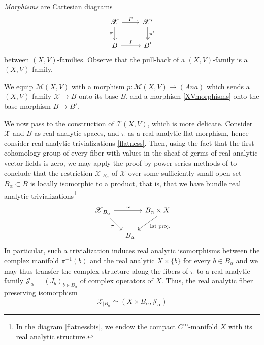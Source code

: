 \documentclass[10pt]{amsart}
\let\mathcal\mathscr
\newcommand{\Ana}{\mathit{Ana}}
\theoremstyle{plain}
\theoremstyle{definition}
\theoremstyle{remark}
\numberwithin{equation}{section}
\begin{document}
\emph{Morphisms} are Cartesian diagrams
\begin{equation}
\label{XVmorphisms}
\begin{tikzcd}
\mathcal X\arrow[r,"F"]\arrow[d,swap,"\pi"]&\mathcal X'\arrow[d,"\pi'"]\\
B\arrow[r,"f"]&B'
\end{tikzcd}
\end{equation}
between $(X,V)$-families. Observe that the pull-back of a $(X,V)$-family is a $(X,V)$-family.

We equip $\mathcal M(X,V)$ with a morphism $p:\mathcal M(X,V)\to (\Ana)$ which sends a $(X,V)$-family $\mathcal X\to B$ onto its base $B$, and a morphism \eqref{XVmorphisms} onto the base morphism $B\to B'$.

We now pass to the construction of $\mathcal T(X, V)$, which is more delicate. Consider $\mathcal X$ and $B$ as real analytic spaces, and $\pi$ as a real analytic flat morphism, hence consider real analytic trivializations \eqref{flatness}. Then, using the fact that the first cohomology group of every fiber with values in the sheaf of germs of real analytic vector fields is zero, we may apply the proof by power series methods of \cite[Th.\,3.2]{MK} to conclude that the restriction $\mathcal X_{\vert B_\alpha}$ of $\mathcal X$ over some sufficiently small open set $B_\alpha\subset B$ is locally isomorphic to a product, that is, that we have bundle real analytic trivializations\footnote{In the diagram \eqref{flatnessbis}, we endow the compact $C^\infty$-manifold $X$ with its real analytic structure.}
\begin{equation}
\label{flatnessbis}
\begin{tikzcd}[column sep=tiny, row sep=normal]
\mathcal X_{\vert B_\alpha}\arrow[rrr,"\simeq"] \arrow[rrd, end anchor = north west,"\pi"'] &&&B_\alpha\times X\arrow[dl, start anchor = south, end anchor = north east,"\text{1st proj.}"]\\
&&B_\alpha&
\end{tikzcd}
\end{equation}
In particular, such a trivialization induces real analytic isomorphisms between the complex manifold $\pi^{-1}(b)$ and the real analytic $X\times\{b\}$ for every $b\in B_\alpha$ and we may thus transfer the complex structure along the fibers of $\pi$ to a real analytic family $\mathcal J_\alpha=(J_b)_{b\in B_\alpha}$ of complex operators of $X$. Thus, the real analytic fiber preserving isomorphism
\begin{equation}
\label{trivialization}
\mathcal X_{\vert B_\alpha}\simeq (X\times B_\alpha, \mathcal J_\alpha)
\end{equation}
\end{document}
